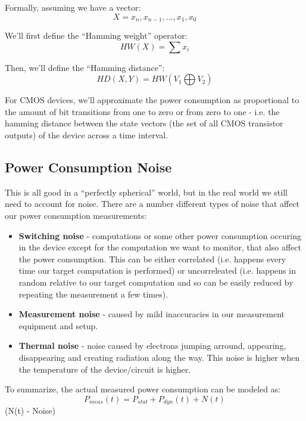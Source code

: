 Formally, assuming we have a vector:
\begin{displaymath}
    X=x_{n},x_{n-1},...,x_{1},x_{0}
\end{displaymath}

We'll first define the ``Hamming weight'' operator:
\begin{displaymath}
    HW(X)=\sum x_{i}
\end{displaymath}

Then, we'll define the ``Hamming distance'': 
\begin{displaymath}
    HD(X,Y)=HW(V_{1} \bigoplus V_{2})
\end{displaymath}

For CMOS devices, we'll approximate the power consumption as proportional to the amount of bit transitions from one to zero or from zero to one - i.e. the hamming distance between the state vectors (the set of all CMOS transistor outputs) of the device across a time interval.

\subsection{Power Consumption Noise}

This is all good in a ``perfectly spherical'' world, but in the real world we still need to account for noise. There are a number different types of noise that affect our power consumption measurements:
\begin{itemize}
    \item \textbf{Switching noise} - computations or some other power consumption occuring in the device except for the computation we want to monitor, that also affect the power consumption. This can be either correlated (i.e. happens every time our target computation is performed) or uncorreleated (i.e. happens in random relative to our target computation and so can be easily reduced by repeating the measurement a few times).
    \item \textbf{Measurement noise} - caused by mild inaccuracies in our measurement equipment and setup.
    \item \textbf{Thermal noise} - noise caused by electrons jumping arround, appearing, disappearing and creating radiation along the way. This noise is higher when the temperature of the device/circuit is higher.
\end{itemize}

To summarize, the actual measured power consumption can be modeled as:
\begin{displaymath}
    P_{meas}(t)=P_{stat} + P_{dyn}(t) + N(t)
\end{displaymath}
(N(t) - Noise)

